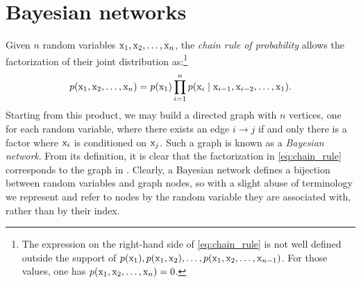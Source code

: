 \section{Bayesian networks}
\label{sec:bayesian_networks}

Given $n$ random variables ${\textnormal{x}}_1, {\textnormal{x}}_2, \dots, {\textnormal{x}}_n$, the \emph{chain rule of probability} allows the factorization of their joint distribution as:\footnote{The expression on the right-hand side of \eqref{eq:chain_rule} is not well defined outside the support of $p({\textnormal{x}}_1), p({\textnormal{x}}_1, {\textnormal{x}}_2), \dots, p({\textnormal{x}}_1, {\textnormal{x}}_2, \dots, {\textnormal{x}}_{n-1})$. For those values, one has $p({\textnormal{x}}_1, {\textnormal{x}}_2, \dots, {\textnormal{x}}_n)=0$.}
\begin{equation}
    \label{eq:chain_rule}
    p({\textnormal{x}}_1,{\textnormal{x}}_2,\dots,{\textnormal{x}}_n) = p({\textnormal{x}}_1) \prod_{i=1}^n p({\textnormal{x}}_i \mid {\textnormal{x}}_{i-1}, {\textnormal{x}}_{i-2}, \dots, {\textnormal{x}}_1).
\end{equation}
Starting from this product, we may build a directed graph with $n$ vertices, one for each random variable, where there exists an edge $i \rightarrow j$ if and only there is a factor where ${\textnormal{x}}_i$ is conditioned on ${\textnormal{x}}_j$. Such a graph is known as a \emph{Bayesian network}. From its definition, it is clear that the factorization in \eqref{eq:chain_rule} corresponds to the graph in . Clearly, a Bayesian network defines a bijection between random variables and graph nodes, so with a slight abuse of terminology we represent and refer to nodes by the random variable they are associated with, rather than by their index.

